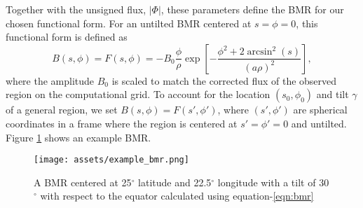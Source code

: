 \documentclass[twoside,12pt]{book}
\begin{document}
Together with the unsigned flux, $|\Phi|$, these parameters define the BMR for our chosen functional form. For an untilted BMR centered at $s=\phi=0$, this functional form is defined as
\begin{equation}
B(s,\phi) = F(s,\phi) = -B_0\frac{\phi}{\rho}\exp\left[-\frac{\phi^2 + 2\arcsin^2(s)}{(a\rho)^2}\right],
\label{eqn:bmr}
\end{equation}
where the amplitude $B_0$ is scaled to match the corrected flux of the observed region on the computational grid. To account for the location $(s_0,\phi_0)$ and tilt $\gamma$ of a general region, we set $B(s,\phi) = F(s',\phi')$, where $(s',\phi')$ are spherical coordinates in a frame where the region is centered at $s'=\phi'=0$ and untilted. Figure \ref{fig:example-bmr} shows an example BMR.

\begin{figure}
    \centering
    \texttt{[image: assets/example\_bmr.png]}
    \caption{A BMR centered at 25$^{\circ}$ latitude and 22.5$^{\circ}$ longitude with a tilt of 30$^{\circ}$ with respect to the equator calculated using equation-\ref{eqn:bmr}}
    \label{fig:example-bmr}
\end{figure}
\end{document}

